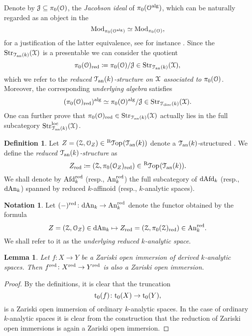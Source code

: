 \documentclass[10pt,a4paper,reqno]{amsart} %
\theoremstyle{plain}
\newtheorem{lem}[thm]{Lemma}
\theoremstyle{definition}
\newtheorem{defin}[thm]{Definition}
\newtheorem{notation}[thm]{Notation}
\theoremstyle{remark}
\numberwithin{equation}{section}
\begin{document}
Denote by $\mathcal J \subseteq \pi_0(\mathcal O)$, the \emph{Jacobson ideal} of $\pi_0(\mathcal O ^\mathrm{alg})$, which can be naturally regarded as an object
in the \infcat
    \[
        \mathrm{Mod}_{\pi_0(\mathcal O ^\mathrm{alg})} \simeq \mathrm{Mod}_{\pi_0(\mathcal O)},  
    \]
for a justification of the latter equivalence, see for instance \cite[Theorem 4.5]{Porta_Yu_Representability} .
Since the \infcat $\mathrm{Str}_{\mathcal T_{\mathrm{an}}(k)}(\mathcal X)$ is a presentable \infcat we can consider the quotient
    \[
        \pi_0(\mathcal O)_{\mathrm{red}} \coloneqq \pi_0(\mathcal O)/\mathcal J \in \mathrm{Str}_{\mathcal T_{\mathrm{an}}(k)}(\mathcal X)  ,
    \]
which we refer to the \emph{reduced $\mathcal T_{\mathrm{an}}(k)$-structure on $\mathcal X$ associated to $\pi_0(\mathcal O)$}. Moreover, the corresponding \emph{underlying algebra} satisfies
    \[(\pi_0(\mathcal O)_{\mathrm{red}})^\mathrm{alg} \simeq \pi_0(\mathcal O)^\mathrm{alg}/ \mathcal J \in \mathrm{Str}_{\mathcal T_{\mathrm{disc}}(k)}(\mathcal X).\]
One can further prove that
$\pi_0(\mathcal O)_{\mathrm{red}} \in \mathrm{Str}_{\mathcal T_{\mathrm{an}}(k)}(\mathcal X)$ actually lies in the full subcategory $\mathrm{Str}^\mathrm{loc}_{\mathcal T_{\mathrm{an}}(k)}(\mathcal X)$.

\begin{defin}
    Let $Z = (\cZ, \cO_Z) \in \RTop(\cTan(k))$ denote a $\mathcal T_{\mathrm{an}}(k)$-structured \inftopos. We define the \emph{reduced $\mathcal T_{\mathrm{an}}(k)$-structure \inftopos} as
        \[
            Z_\red \coloneqq (\cZ, \pi_0(\cO_Z)_\red) \in \RTop(\cTank).
        \]
    We shall denote by $\mathrm{Afd}_k^{\mathrm{red}}$ (resp., $\mathrm{An}_k^{\mathrm{red}}$) the full subcategory of $\mathrm{dAfd}_k$ (resp., $\mathrm{dAn}_k$)
    spanned by reduced $k$-affinoid (resp., $k$-analytic spaces).
\end{defin}

\begin{notation}
    Let $(-)^{\mathrm{red}} \colon \mathrm{dAn}_k \to \mathrm{An}_k^{\mathrm{red}}$ denote the functor obtained by the formula
        \[
            Z = (\mathcal Z, \mathcal O_Z) \in \mathrm{dAn}_k\mapsto Z_{\mathrm{red}} = (\mathcal Z, \pi_0(\mathcal Z)_{\mathrm{red}}) \in \mathrm{An}_k^{\mathrm{red}}.
        \]
    We shall refer to it as the \emph{underlying reduced $k$-analytic space}.
\end{notation}

\begin{lem}
    Let $f \colon X \to Y$ be a Zariski open immersion of derived $k$-analytic spaces. Then $f^{\mathrm{red}} \colon X^{\mathrm{red}} \to Y^{\mathrm{red}}$ is also
    a Zariski open immersion.
\end{lem}

\begin{proof}
    By the definitions, it is clear that the truncation
        \[
            \mathrm{t}_0(f) \colon \mathrm{t}_0(X) \to \mathrm{t}_0(Y),  
        \]
    is a Zariski open immersion of ordinary $k$-analytic spaces. In the case of ordinary $k$-analytic spaces it is clear from the construction
    that the reduction of Zariski open immersions is again a Zariski open immersion.
\end{proof}
\end{document}
